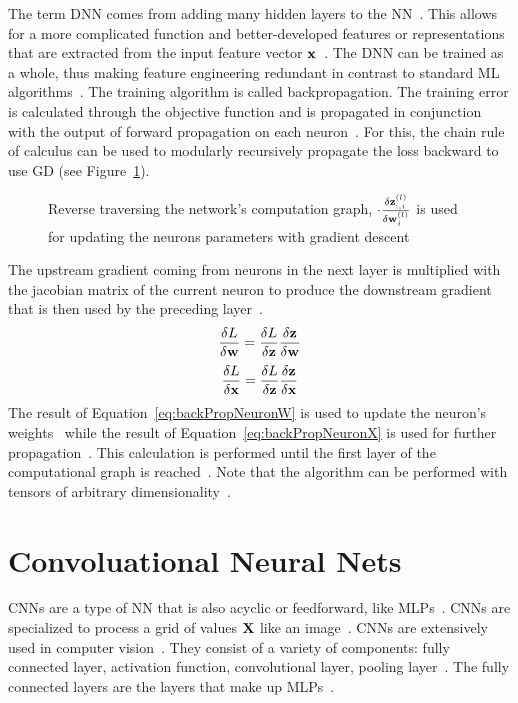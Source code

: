 The term \ac{DNN} comes from adding many hidden layers to the \ac{NN}~\citep{shrestha_review_2019}.
This allows for a more complicated function and better-developed features or representations that
are extracted from the input feature vector $\textbf{x}$~\citep{oyedotun_deep_2015}.
The \ac{DNN} can be trained as a whole, thus making feature engineering redundant in contrast to
standard \ac{ML} algorithms~\citep{arpteg_software_2018}.
The training algorithm is called backpropagation.
The training error is calculated through the objective function and is propagated
in conjunction with the output of forward propagation on each neuron~\citep{goodfellow_deep_2016}.
For this, the chain rule of calculus can be used to modularly recursively propagate the
loss backward to use \ac{GD} (see Figure~\ref{fig:error-backpropagation}).
\begin{figure}[ht]
	\centering
    
	\caption[Backpropagation of errors through the network.]{%
        Reverse traversing the network's computation graph,
        $\cdot \frac{\delta \textbf{z}_{:,i}^{(l)}}{\delta \textbf{w}_i^{(l)}}$ is used for
        updating the neurons parameters with gradient descent\label{fig:error-backpropagation}
    }
\end{figure}
The upstream gradient coming from neurons in the next layer is multiplied with the
jacobian matrix of the current neuron to produce the downstream gradient that is then used by
the preceding layer~\citep{boue_deep_2018,goodfellow_deep_2016}.
\begin{equation}\label{eq:backPropNeuronW}
    \frac{\delta L}{\delta\textbf{w}} = \frac{\delta L}{\delta\textbf{z}} \frac{\delta\textbf{z}}{\delta\textbf{w}}
\end{equation}
\begin{equation}\label{eq:backPropNeuronX}
    \frac{\delta L}{\delta\textbf{x}} = \frac{\delta L}{\delta\textbf{z}}\frac{\delta\textbf{z}}{\delta\textbf{x}}
\end{equation}
The result of Equation~\ref{eq:backPropNeuronW} is used to update the neuron's weights \w\ while
the result of Equation~\ref{eq:backPropNeuronX} is used for further
propagation~\citep{boue_deep_2018}.
This calculation is performed until the first layer of the computational graph is
reached~\citep{goodfellow_deep_2016}.
Note that the algorithm can be performed with tensors of arbitrary
dimensionality~\citep{goodfellow_deep_2016}.

\section{Convoluational Neural Nets}\label{se:cnn}
\acp{CNN} are a type of \ac{NN} that is also acyclic or feedforward, like
\acp{MLP}~\citep{chauhan_review_2018}.
\acp{CNN} are specialized to process a grid of values $\textbf{X}$ like an image~\citep{goodfellow_deep_2016}.
\acp{CNN} are extensively used in computer vision~\citep{chauhan_review_2018}.
They consist of a variety of components: fully connected layer, activation function,
convolutional layer, pooling layer~\citep{chauhan_review_2018,ponti_everything_2017}.
The fully connected layers are the layers that make up \acp{MLP}~\citep{ponti_everything_2017}.

